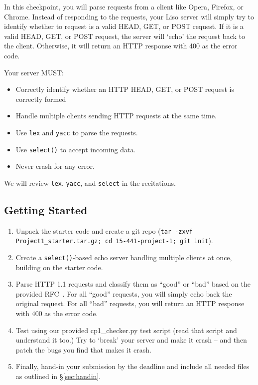 \label{sec:cp1}
In this checkpoint, you will parse requests from a client like Opera, Firefox, or Chrome.
Instead of responding to the requests, your Liso server will simply try to identify whether to request is a valid HEAD, GET, or POST request.
If it is a valid HEAD, GET, or POST request, the server will `echo' the request back to the client.
Otherwise, it will return an HTTP response with 400 as the error code.

\vspace{5pt}

\noindent Your server MUST:
\begin{itemize}
  \item Correctly identify whether an HTTP HEAD, GET, or POST request is correctly formed  
  \item Handle multiple clients sending HTTP requests at the same time.
  \item Use {\tt lex} and {\tt yacc} to parse the requests.
  \item Use {\tt select()} to accept incoming data.
  \item Never crash for any error.
\end{itemize}
We will review {\tt lex}, {\tt yacc}, and {\tt select} in the recitations.

\subsection{Getting Started}
\begin{enumerate}
  \item Unpack the starter code and create a git repo (\texttt{tar -zxvf Project1\_starter.tar.gz; cd 15-441-project-1; git init}).

  \item Create a \texttt{select()}-based echo server handling multiple clients at once, building on the  starter code.  

  \item Parse HTTP 1.1 requests and classify them as ``good'' or ``bad'' based on the provided RFC~\cite{httprfc}. For all ``good'' requests, you will simply echo back the original request. For all ``bad'' requests, you will return an HTTP response with 400 as the error code.

  \item Test using our provided cp1\_checker.py test script (read that script and understand it too.) Try to `break' your server and make it crash -- and then patch the bugs you find that makes it crash.

  \item Finally, hand-in your
submission by the deadline and include all needed files as outlined in
\S\ref{sec:handin}.\\
\end{enumerate}

